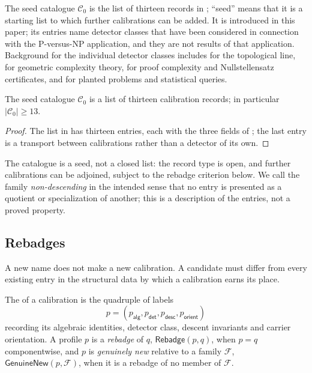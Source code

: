 The seed catalogue \(\mathcal C_{0}\) is the list of thirteen records in
; ``seed'' means that it is a starting list
to which further calibrations can be added.  It is introduced in this
paper; its
entries name detector classes that have been considered in connection
with the P-versus-NP application, and they are not results of that
application.  Background for the individual detector classes includes
\cite{Lovasz1978Kneser} for the topological line,
\cite{MulmuleySohoni2001GCT} for geometric complexity theory,
\cite{Krajicek2019ProofComplexity} for proof complexity and
Nullstellensatz certificates, and
\cite{AlonKrivelevichSudakov1998PlantedClique,Kearns1998SQ} for planted
problems and statistical queries.

\begin{theorem}\label{thm:calibration-family-structure}
The seed catalogue \(\mathcal C_{0}\) is a list of thirteen calibration
records; in particular \(|\mathcal C_{0}|\ge 13\).
\end{theorem}

\begin{proof}
The list in  has thirteen entries, each with the three fields of ; the last entry is a
transport between calibrations rather than a detector of its own.
\end{proof}

The catalogue is a seed, not a closed list: the record type is open,
and further calibrations can be adjoined, subject to the rebadge
criterion below.  We call the family \emph{non-descending} in the
intended sense that no entry is presented as a quotient or
specialization of another; this is a description of the entries, not a
proved property.



\subsection{Rebadges}\label{sec:calibration:rebadge}

A new name does not make a new calibration.  A candidate must differ
from every existing entry in the structural data by which a calibration
earns its place.

\begin{definition}\label{def:four-axis-profile}
The \emph{\fourAxis} of a calibration is the quadruple of labels
\[
  p=(p_{\mathsf{alg}},p_{\mathsf{det}},p_{\mathsf{desc}},p_{\mathsf{orient}})
\]
recording its algebraic identities, detector class, descent invariants
and carrier orientation.  A profile \(p\) is a \emph{rebadge} of \(q\),
\(\mathsf{Rebadge}(p,q)\), when \(p=q\) componentwise, and \(p\) is
\emph{genuinely new} relative to a family \(\mathcal F\),
\(\mathsf{GenuineNew}(p,\mathcal F)\), when it is a rebadge of no member
of \(\mathcal F\).
\end{definition}

